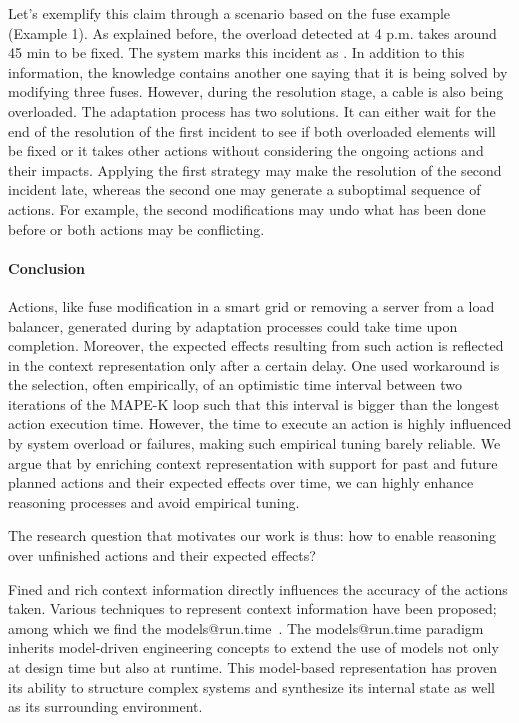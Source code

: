Let's exemplify this claim through a scenario based on the fuse example (\cf Example 1).
As explained before, the overload detected at 4 p.m. takes around 45 min to be fixed.
The system marks this incident as .
In addition to this information, the knowledge contains another one saying that it is being solved by modifying three fuses.
However, during the resolution stage, a cable is also being overloaded.
The adaptation process has two solutions.
It can either wait for the end of the resolution of the first incident to see if both overloaded elements will be fixed or it takes other actions without considering the ongoing actions and their impacts.
Applying the first strategy may make the resolution of the second incident late, whereas the second one may generate a suboptimal sequence of actions.
For example, the second modifications may undo what has been done before or both actions may be conflicting.

\paragraph{Conclusion}
Actions, like fuse modification in a smart grid or removing a server from a load balancer, generated during by adaptation processes could take time upon completion. 
Moreover, the expected effects resulting from such action is reflected in the context representation only after a certain delay. 
One used workaround is the selection, often empirically, of an optimistic time interval between two iterations of the MAPE-K loop such that this interval is bigger than the longest action execution time.
However, the time to execute an action is highly influenced by system overload or failures, making such empirical tuning barely reliable.
We argue that by enriching context representation with support for past and future planned actions and their expected effects over time, we can highly enhance reasoning processes and avoid empirical tuning.

The research question that motivates our work is thus: how to enable reasoning over unfinished actions and their expected effects?

Fined and rich context information directly influences the accuracy of the actions taken.
Various techniques to represent context information have been proposed; among which we find the models@run.time~\cite{DBLP:journals/computer/MorinBJFS09, DBLP:journals/computer/BlairBF09}.
The models@run.time \linebreak paradigm inherits model-driven engineering concepts to extend the use of models not only at design time but also at runtime. 
This model-based representation has proven its ability to structure complex systems and synthesize its internal state as well as its surrounding environment.

